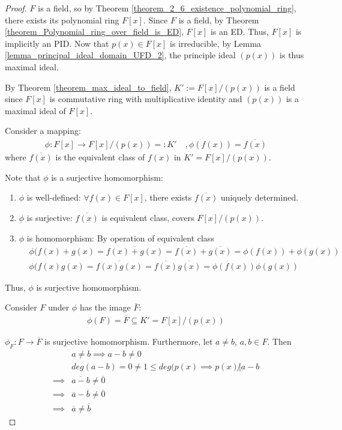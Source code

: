 \documentclass[utf8]{ctexbook}
\theoremstyle{definition}
\begin{document}
\begin{proof}
$F$ is a field, so by Theorem \ref{theorem_2_6_existence_polynomial_ring}, there exists its polynomial ring $F[x]$. Since $F$ is a field, by Theorem \ref{theorem_Polynomial_ring_over_field_is_ED}, $F[x]$ is an ED. Thus, $F[x]$ is implicitly an PID. Now that $p(x) \in F[x]$ is irreducible, by Lemma \ref{lemma_principal_ideal_domain_UFD_2}, the principle ideal $(p(x))$ is thus maximal ideal.

By Theorem \ref{theorem_max_ideal_to_field}, $K' := F[x] / (p(x))$ is a field since $F[x]$ is commutative ring with multiplicative identity and $(p(x))$ is a maximal ideal of $F[x]$.

Consider a mapping:
\begin{align*}
\phi : F[x] \longrightarrow F[x] / (p(x)) =: K' \quad, \phi(f(x)) = \overline{f(x)}
\end{align*}
where $\overline{f(x)}$ is the equivalent class of $f(x)$ in $K'= F[x]/(p(x))$.

Note that $\phi$ is a surjective homomorphism:
\begin{enumerate}
\item{$\phi$ is well-defined: $\forall f(x) \in F[x]$, there exists $\overline{f(x)}$ uniquely determined.}
\item{$\phi$ is surjective: $\overline{f(x)}$ is equivalent class, covers $F[x] / (p(x))$.}
\item{$\phi$ is homomorphism: By operation of equivalent class
\begin{align*}
& \phi(f(x) + g(x) = \overline{f(x) + g(x)} = \overline{f(x)} + \overline{g(x)} = \phi(f(x)) + \phi(g(x)) \\
& \phi(f(x)  g(x) = \overline{f(x)  g(x)} = \overline{f(x)}  \overline{g(x)} = \phi(f(x))  \phi(g(x))
\end{align*}
}
\end{enumerate}

Thus, $\phi$ is surjective homomorphism.

Consider $F$ under $\phi$ has the image $\overline{F}$:
\begin{align*}
\phi(F) = \overline{F} \subseteq K' = F[x]/(p(x))
\end{align*}

$\phi_{F} : F \longrightarrow \overline{F}$ is surjective homomorphism. Furthermore, let $a \neq b$, $a, b \in F$. Then
\begin{align*}
& a \neq b \implies a- b \neq 0 \\
& deg(a-b) = 0 \neq 1 \leq  deg(p(x) \implies p(x) \not | a - b \\
\implies & \overline{a - b } \neq \overline{0} \\
\implies & \overline{a} - \overline{b} \neq \overline{0} \\
\implies & \overline{a} \neq \overline{b}
\end{align*}


\end{proof}
\end{document}
